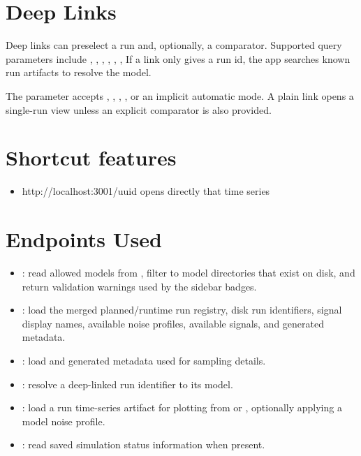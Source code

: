 \documentclass[11pt]{article}
\begin{document}
\section*{Deep Links}
Deep links can preselect a run and, optionally, a comparator. 
Supported query parameters include , , , , , , 
If a link only gives a run id, the app searches known run artifacts to resolve the model.

The  parameter accepts , , , , or an implicit automatic mode. A plain  link opens a single-run view unless an explicit comparator is also provided.

\section*{Shortcut features}
\begin{itemize}
    \item http://localhost:3001/{uuid} opens directly that time series
\end{itemize}

\section*{Endpoints Used}

\begin{itemize}
\item {}: read allowed models from , filter to model directories that exist on disk, and return validation warnings used by the sidebar badges.
\item {}: load the merged planned/runtime run registry, disk run identifiers, signal display names, available noise profiles, available signals, and generated metadata.
\item {}: load  and generated metadata used for sampling details.
\item {}: resolve a deep-linked run identifier to its model.
\item {}: load a run time-series artifact for plotting from  or , optionally applying a model noise profile.
\item {}: read saved simulation status information when present.
\end{itemize}
\end{document}
